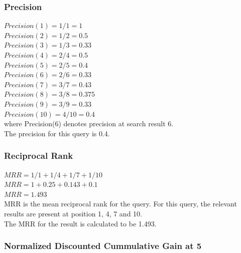 \documentclass[12pt]{report}
\begin{document}
\subsubsection{ Precision}

$Precision(1) = 1/1 = 1$\\
$Precision(2) = 1/2 = 0.5$\\ 
$Precision(3) = 1/3 = 0.33$\\
$Precision(4) = 2/4 = 0.5$\\
$Precision(5) = 2/5 = 0.4$\\
$Precision(6) = 2/6 = 0.33$\\
$Precision(7) = 3/7 = 0.43$\\
$Precision(8) = 3/8 = 0.375$\\
$Precision(9) = 3/9 = 0.33$\\
$Precision(10) = 4/10 = 0.4$\\
where Precision(6) denotes precision at search result 6.\\
The precision for this query is 0.4. \\  

\subsubsection{Reciprocal Rank}
$MRR = 1/1 + 1/4 + 1/7 + 1/10$\\
$MRR = 1+ 0.25 + 0.143 + 0.1$\\
$MRR = 1.493$\\
MRR is the mean reciprocal rank for the query. For this query, the relevant results are present at position 1, 4, 7 and 10.\\
The MRR for the result is calculated to be 1.493.

\subsubsection{Normalized Discounted Cummulative Gain at 5}
\end{document}
